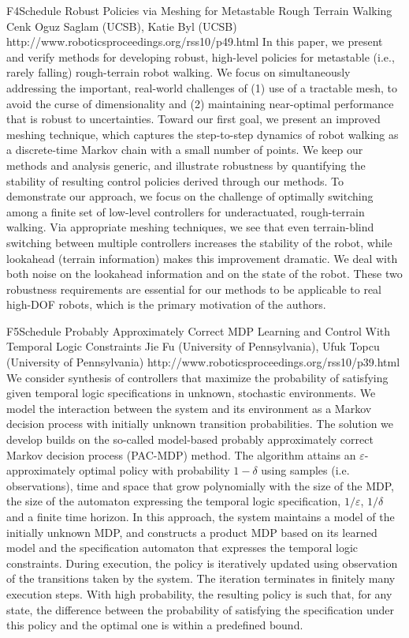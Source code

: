 \begin{spacing}{1.0}
\descriptionPaper
{F4}{Schedule}
{	
Robust Policies via Meshing for Metastable Rough Terrain Walking
}
{
Cenk Oguz Saglam (UCSB), Katie Byl (UCSB)
}
{
http://www.roboticsproceedings.org/rss10/p49.html
}
{
In this paper, we present and verify methods for developing robust, high-level policies for metastable (i.e., rarely falling) rough-terrain robot walking. We focus on simultaneously addressing the important, real-world challenges of (1) use of a tractable mesh, to avoid the curse of dimensionality and (2) maintaining near-optimal performance that is robust to uncertainties. Toward our first goal, we present an improved meshing technique, which captures the step-to-step dynamics of robot walking as a discrete-time Markov chain with a small number of points. We keep our methods and analysis generic, and illustrate robustness by quantifying the stability of resulting control policies derived through our methods. To demonstrate our approach, we focus on the challenge of optimally switching among a finite set of low-level controllers for underactuated, rough-terrain walking. Via appropriate meshing techniques, we see that even terrain-blind switching between multiple controllers increases the stability of the robot, while lookahead (terrain information) makes this improvement dramatic. We deal with both noise on the lookahead information and on the state of the robot. These two robustness requirements are essential for our methods to be applicable to real high-DOF robots, which is the primary motivation of the authors.
}



\descriptionPaper
{F5}{Schedule}
{	
Probably Approximately Correct MDP Learning and Control With Temporal Logic Constraints
}
{
Jie Fu (University of Pennsylvania), Ufuk Topcu (University of Pennsylvania)
}
{
http://www.roboticsproceedings.org/rss10/p39.html
}
{
We consider synthesis of controllers that maximize the probability of satisfying given temporal logic specifications in unknown, stochastic environments. We model the interaction between the system and its environment as a Markov decision process with initially unknown transition probabilities. The solution we develop builds on the so-called model-based probably approximately correct Markov decision process (PAC-MDP) method. The algorithm attains an $\varepsilon$-approximately optimal policy with probability $1-\delta$ using samples (i.e. observations), time and space that grow polynomially with the size of the MDP, the size of the automaton expressing the temporal logic specification, $1/\varepsilon$, $1/\delta$ and a finite time horizon. In this approach, the system maintains a model of the initially unknown MDP, and constructs a product MDP based on its learned model and the specification automaton that expresses the temporal logic constraints. During execution, the policy is iteratively updated using observation of the transitions taken by the system. The iteration terminates in finitely many execution steps. With high probability, the resulting policy is such that, for any state, the difference between the probability of satisfying the specification under this policy and the optimal one is within a predefined bound.
}





\end{spacing}
